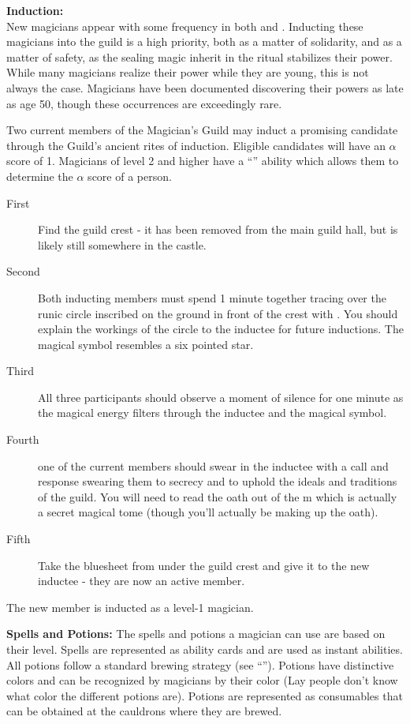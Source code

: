 \documentclass[blue]{NeptuneBall}
\begin{document}
{\bf Induction:}\\
New magicians appear with some frequency in both \pPacifica{} and \pAtlantis{}. Inducting these magicians into the guild is a high priority, both as a matter of solidarity, and as a matter of safety, as the sealing magic inherit in the ritual stabilizes their power. While many magicians realize their power while they are young, this is not always the case. Magicians have been documented discovering their powers as late as age 50, though these occurrences are exceedingly rare.

Two current members of the Magician's Guild may induct a promising candidate through the Guild's ancient rites of induction. Eligible candidates will have an $\alpha$ score of 1. Magicians of level 2 and higher have a ``\aPerceive{}'' ability which allows them to determine the $\alpha$ score of a person.
\begin{description}
\item[First] Find the guild crest - it has been removed from the main guild hall, but is likely still somewhere in the castle. 
\item[Second] Both inducting members must spend 1 minute together tracing over the runic circle inscribed on the ground in front of the crest with \iChalk{}. You should explain the workings of the circle to the inductee for future inductions. The magical symbol resembles a six pointed star. 
\item[Third] All three participants should observe a moment of silence for one minute as the magical energy filters through the inductee and the magical symbol. \item[Fourth] one of the current members should swear in the inductee with a call and response swearing them to secrecy and to uphold the ideals and traditions of the guild. You will need to read the oath out of the \iBook{}m which is actually a secret magical tome (though you'll actually be making up the oath). 
\item[Fifth] Take the bluesheet from under the guild crest and give it to the new inductee - they are now an active member.
\end{description}

The new member is inducted as a level-1 magician.

{\bf Spells and Potions:}
The spells and potions a magician can use are based on their level. Spells are represented as ability cards and are used as instant abilities. All potions follow a standard brewing strategy (see ``\gPotions{}''). Potions have distinctive colors and can be recognized by magicians by their color (Lay people don't know what color the different potions are). Potions are represented as consumables that can be obtained at the cauldrons where they are brewed.
\end{document}
